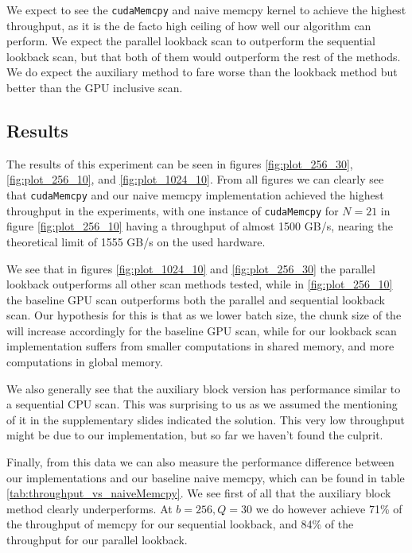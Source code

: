 \documentclass[twocolumn]{article}
\begin{document}
We expect to see the \verb|cudaMemcpy| and naive memcpy kernel to achieve the highest throughput, as it is the de facto high ceiling of how well our algorithm can perform. We expect the parallel lookback scan to outperform the sequential lookback scan, but that both of them would outperform the rest of the methods. We do expect the auxiliary method to fare worse than the lookback method but better than the GPU inclusive scan.

\subsection{Results}
The results of this experiment can be seen in figures \ref{fig:plot_256_30}, \ref{fig:plot_256_10}, and \ref{fig:plot_1024_10}. From all figures we can clearly see that \verb|cudaMemcpy| and our naive memcpy implementation achieved the highest throughput in the experiments, with one instance of \verb|cudaMemcpy| for $N=21$ in figure \ref{fig:plot_256_10} having a throughput of almost 1500 GB/s, nearing the theoretical limit of 1555 GB/s on the used hardware.

We see that in figures \ref{fig:plot_1024_10} and \ref{fig:plot_256_30} the parallel lookback outperforms all other scan methods tested, while in \ref{fig:plot_256_10} the baseline GPU scan outperforms both the parallel and sequential lookback scan. Our hypothesis for this is that as we lower batch size, the chunk size of the will increase accordingly for the baseline GPU scan, while for our lookback scan implementation suffers from smaller computations in shared memory, and more computations in global memory.

We also generally see that the auxiliary block version has performance similar to a sequential CPU scan. This was surprising to us as we assumed the mentioning of it in the supplementary slides indicated the solution. This very low throughput might be due to our implementation, but so far we haven't found the culprit.

Finally, from this data we can also measure the performance difference between our implementations and our baseline naive memcpy, which can be found in table \ref{tab:throughput_vs_naiveMemcpy}. We see first of all that the auxiliary block method clearly underperforms. At $b=256,Q=30$ we do however achieve 71\% of the throughput of memcpy for our sequential lookback, and 84\% of the throughput for our parallel lookback.
\end{document}
